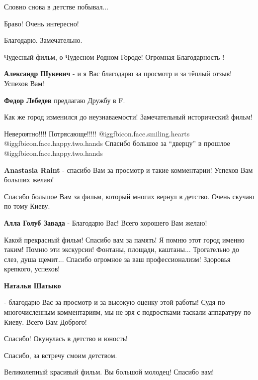 \begin{itemize}
Словно снова в детстве побывал...

Браво! Очень интересно!

Благодарю. Замечательно.

Чудесный фильм, о Чудесном Родном Городе! Огромная Благодарность !

\begin{itemize} %
\textbf{Александр Шукевич} - и я Вас благодарю за просмотр и за тёплый отзыв! Успехов Вам!

\textbf{Федор Лебедев} предлагаю Дружбу в F.
\end{itemize} %

Как же город изменился до неузнаваемости! Замечательный исторический фильм!

Невероятно!!!! Потрясающе!!!!!  @igg{fbicon.face.smiling.hearts}  @igg{fbicon.face.happy.two.hands} 
Спасибо большое за \enquote{дверцу} в прошлое @igg{fbicon.face.happy.two.hands} 

\textbf{Anastasia Raint} - спасибо Вам за просмотр и такие комментарии! Успехов Вам больших желаю!

Спасибо большое Вам за фильм, который многих вернул в детство. Очень скучаю по тому Киеву.

\textbf{Алла Голуб Завада} - Благодарю Вас! Всего хорошего Вам желаю!


Какой прекрасный фильм! Спасибо вам за память! Я помню этот город именно
таким! Помню эти экскурсии! Фонтаны, площади, каштаны... Трогательно до слез,
душа щемит... Спасибо огромное за ваш профессионализм! Здоровья крепкого,
успехов!

\textbf{Наталья Шатыко} 

- благодарю Вас за просмотр и за высокую оценку этой работы! Судя по
многочисленным комментариям, мы не зря с подростками таскали аппаратуру по
Киеву. Всего Вам Доброго!

Спасибо! Окунулась в детство и юность!

Спасибо, за встречу смоим детством.

Великолепный красивый фильм. Вы большой молодец! Спасибо вам!


\end{itemize}

